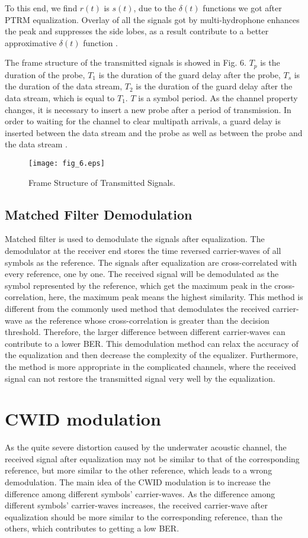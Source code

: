 \documentclass[journal]{IEEEtran}
\begin{document}
To this end, we find $r(t)$ is $s(t)$, due to the $\delta (t)$
functions we got after PTRM equalization. Overlay of all the signals
got by multi-hydrophone enhances the peak and suppresses the side
lobes, as a result contribute to a better approximative $\delta (t)$
function \cite{Rouseff2001}.

The frame structure of the transmitted signals is showed in Fig. 6.
${T_p}$ is the duration of the probe, ${T_1}$ is the duration of the
guard delay after the probe, ${T_s}$ is the duration of the data
stream, ${T_2}$ is the duration of the guard delay after the data
stream, which is equal to ${T_1}$. $T$ is a symbol period. As the
channel property changes, it is necessary to insert a new probe
after a period of transmission. In order to waiting for the channel
to clear multipath arrivals, a guard delay is inserted between the
data stream and the probe as well as between the probe and the data
stream \cite{Rouseff2001,Yin2008}.
\begin{figure}[!t]
\centering
\texttt{[image: fig\_6.eps]}
\caption{Frame Structure of Transmitted Signals.} \label{fig_sim}
\end{figure}
\subsection{Matched Filter Demodulation}
Matched filter is used to demodulate the signals after equalization.
The demodulator at the receiver end stores the time reversed
carrier-waves of all symbols as the reference. The signals after
equalization are cross-correlated with every reference, one by one.
The received signal will be demodulated as the symbol represented by
the reference, which get the maximum peak in the cross-correlation,
here, the maximum peak means the highest similarity. This method is
different from the commonly used method that demodulates the
received carrier-wave as the reference whose cross-correlation is
greater than the decision threshold. Therefore, the larger
difference between different carrier-waves can contribute to a lower
BER. This demodulation method can relax the accuracy of the
equalization and then decrease the complexity of the equalizer.
Furthermore, the method is more appropriate in the complicated
channels, where the received signal can not restore the transmitted
signal very well by the equalization.
\section{CWID modulation}
As the quite severe distortion caused by the underwater acoustic
channel, the received signal after equalization may not be similar
to that of the corresponding reference, but more similar to the
other reference, which leads to a wrong demodulation. The main idea
of the CWID modulation is to increase the difference among different
symbols' carrier-waves. As the difference among different symbols'
carrier-waves increases, the received carrier-wave after
equalization should be more similar to the corresponding reference,
than the others, which contributes to getting a low BER.
\end{document}
